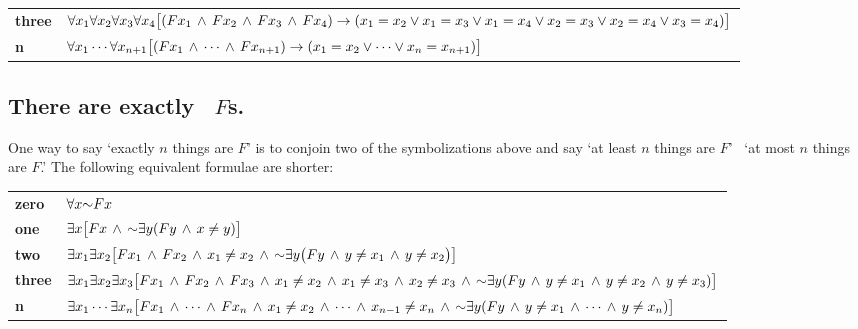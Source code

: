 {\begin{longtabu}{X[1,r]X[7,1]}
\textbf{three} & $\forall x_1\forall x_2\forall x_3\forall x_4\bigl[(Fx_1 \,\land\, Fx_2 \,\land\, Fx_3 \,\land\, Fx_4) \rightarrow (x_1=x_2 \lor x_1=x_3 \lor x_1=x_4 \lor x_2=x_3 \lor x_2=x_4 \lor x_3=x_4)\bigr]$ \\

\textbf{n} & $\forall x_1\cdots\forall x_{n+1}
\bigl[(Fx_1\,\land\, \cdots \,\land\, Fx_{n+1}) \rightarrow (x_1=x_2 \lor \cdots \lor x_n=x_{n+1})\bigr]$
\end{longtabu}

\subsection*{There are exactly \blank\ $F$s.}
\label{summary.exactly}

One way to say `exactly $n$ things are $F$' is to conjoin two of the symbolizations above and say `at least $n$ things are $F$' \eand\ `at most $n$ things are $F$.' The following equivalent formulae are shorter:
\begin{longtabu}{X[1,r]X[7,1]}
\textbf{zero} & $\forall x\mathord{\sim} Fx$ \\

\textbf{one} & $\exists x\bigl[Fx \,\land\, \mathord{\sim}\exists y(Fy \,\land\, x\neq y)\bigr]$ \\

\textbf{two} &  $\exists x_1\exists x_2\bigl[Fx_1 \,\land\, Fx_2 \,\land\, x_1 \neq x_2 \,\land\, \mathord{\sim}\exists y\bigl(Fy \,\land\, y\neq x_1 \,\land\, y \neq x_2\bigr) \bigr]$ \\

\textbf{three} & $\exists x_1\exists x_2\exists x_3\bigl[Fx_1 \,\land\, Fx_2 \,\land\, Fx_3 \,\land\, x_1 \neq x_2 \,\land\, x_1 \neq x_3 \,\land\, x_2 \neq x_3 \,\land\, \mathord{\sim}\exists y(Fy \,\land\, y \neq x_1 \,\land\, y \neq x_2 \,\land\, y\neq x_3) \bigr]$ \\

\textbf{n} & $\exists x_1\cdots\exists x_n\bigl[Fx_1 \,\land\,\cdots\,\land\, Fx_n  \,\land\, x_1 \neq x_2 \,\land\,\cdots\,\land\, x_{n-1}\neq x_n \,\land\,  \mathord{\sim}\exists y(Fy \,\land\, y\neq x_1 \,\land\, \cdots \,\land\, y\neq x_n)\bigr]$ \\
\end{longtabu}

}
